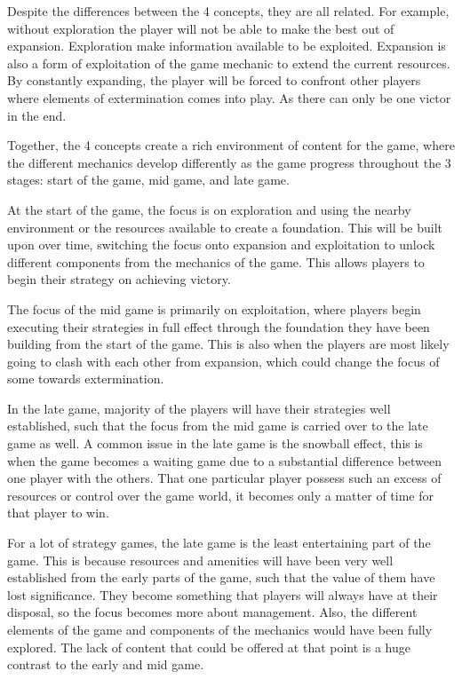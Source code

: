 Despite the differences between the 4 concepts, they are all related. For example, without exploration the player will not be able to make the best out of expansion. Exploration make information available to be exploited. Expansion is also a form of exploitation of the game mechanic to extend the current resources. By constantly expanding, the player will be forced to confront other players where elements of extermination comes into play. As there can only be one victor in the end.

Together, the 4 concepts create a rich environment of content for the game, where the different mechanics develop differently as the game progress throughout the 3 stages: start of the game, mid game, and late game.

At the start of the game, the focus is on exploration and using the nearby environment or the resources available to create a foundation. This will be built upon over time, switching the focus onto expansion and exploitation to unlock different components from the mechanics of the game. This allows players to begin their strategy on achieving victory. 


The focus of the mid game is primarily on exploitation, where players begin executing their strategies in full effect through the foundation they have been building from the start of the game. This is also when the players are most likely going to clash with each other from expansion, which could change the focus of some towards extermination.

In the late game, majority of the players will have their strategies well established, such that the focus from the mid game is carried over to the late game as well. A common issue in the late game is the snowball effect, this is when the game becomes a waiting game due to a substantial difference between one player with the others. That one particular player possess such an excess of resources or control over the game world, it becomes only a matter of time for that player to win.

For a lot of strategy games, the late game is the least entertaining part of the game. This is because resources and amenities will have been very well established from the early parts of the game, such that the value of them have lost significance. They become something that players will always have at their disposal, so the focus becomes more about management. Also, the different elements of the game and components of the mechanics would have been fully explored. The lack of content that could be offered at that point is a huge contrast to the early and mid game. 











\begin{comment}



\end{comment}
